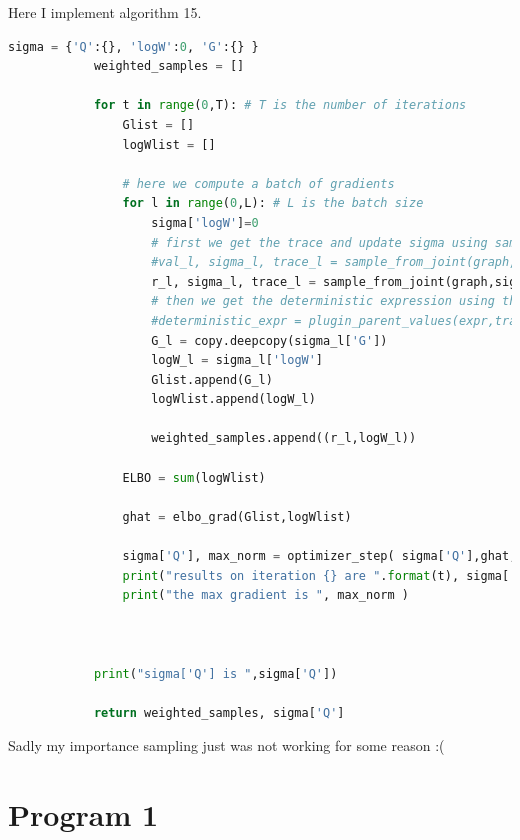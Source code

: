 \documentclass[12pt]{article}%
\theoremstyle{definition}
\begin{document}
		Here I implement algorithm 15.
		\begin{lstlisting}[language=Python]
		    sigma = {'Q':{}, 'logW':0, 'G':{} }     
		    weighted_samples = []
		
		    for t in range(0,T): # T is the number of iterations
		        Glist = []
		        logWlist = []
		        
		        # here we compute a batch of gradients
		        for l in range(0,L): # L is the batch size
		            sigma['logW']=0
		            # first we get the trace and update sigma using sample from joint
		            #val_l, sigma_l, trace_l = sample_from_joint(graph,sigma)
		            r_l, sigma_l, trace_l = sample_from_joint(graph,sigma)
		            # then we get the deterministic expression using the trace
		            #deterministic_expr = plugin_parent_values(expr,trace_l)
		            G_l = copy.deepcopy(sigma_l['G'])
		            logW_l = sigma_l['logW']
		            Glist.append(G_l)
		            logWlist.append(logW_l)
		
		            weighted_samples.append((r_l,logW_l))
		
		        ELBO = sum(logWlist)
		
		        ghat = elbo_grad(Glist,logWlist)
		
		        sigma['Q'], max_norm = optimizer_step( sigma['Q'],ghat,t) #update the proposal
		        print("results on iteration {} are ".format(t), sigma['Q'])
		        print("the max gradient is ", max_norm )
		        
		
		
		    print("sigma['Q'] is ",sigma['Q'])
		
		    return weighted_samples, sigma['Q']
		\end{lstlisting}
		
		Sadly my importance sampling just was not working for some reason :( 
		
	\newpage
		
	\section{Program 1}
	
\end{document}
